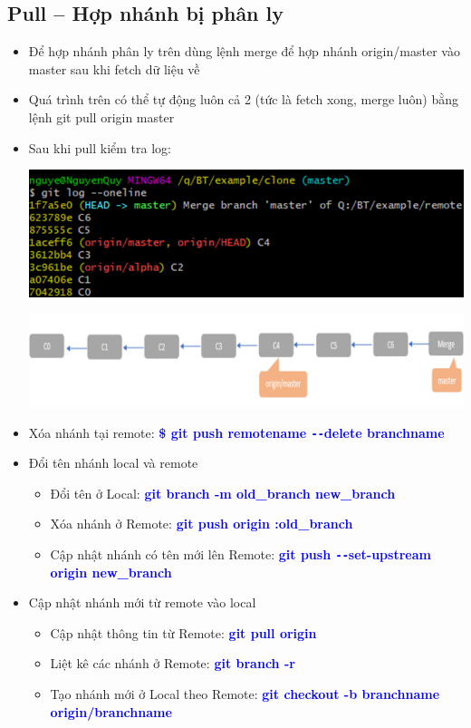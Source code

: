 \documentclass[12pt,a4paper]{report}
\begin{document}
\subsection{Pull – Hợp nhánh bị phân ly}
\begin{itemize}
\item Để hợp nhánh phân ly trên dùng lệnh merge để hợp nhánh origin/master vào master sau khi fetch dữ liệu về
\item Quá trình trên có thể tự động luôn cả 2 (tức là fetch xong, merge luôn) bằng lệnh git pull origin master
\item  Sau khi pull kiểm tra log:
 
 \includegraphics[width=0.8\linewidth]{screenshot076}
 	\label{fig:screenshot076}

 	\includegraphics[width=0.8\linewidth]{screenshot077}

 	\label{fig:screenshot077}

\item Xóa nhánh tại remote: \textcolor{blue}{\bf \hspace{1cm} \$ git push remotename \texttt{-{}-}delete branchname}
 
\item Đổi tên nhánh local và remote
\begin{itemize}
	\item Đổi tên ở Local: \textcolor{blue}{\bf git branch -m old\_branch new\_branch}
  	\item Xóa nhánh ở Remote: \textcolor{blue}{\bf git push origin :old\_branch}
  	\item Cập nhật nhánh có tên mới lên  Remote: \textcolor{blue}{\bf git push \texttt{-{}-}set-upstream origin new\_branch}
\end{itemize}
\item Cập nhật nhánh mới từ remote vào local
 	\begin{itemize}
 	\item Cập nhật thông tin từ Remote: \textcolor{blue}{\bf git pull origin}
	\item Liệt kê các nhánh ở Remote: \textcolor{blue}{\bf git branch -r}
  	\item Tạo nhánh mới ở Local theo Remote: \textcolor{blue}{\bf git checkout -b branchname  origin/branchname}
 \end{itemize}\end{itemize}
\end{document}
